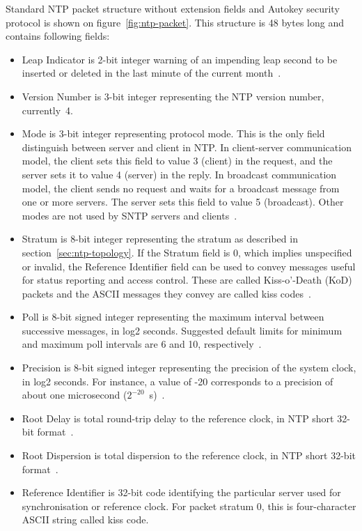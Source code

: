 Standard NTP packet structure without extension fields and
Autokey security protocol is shown on figure~\ref{fig:ntp-packet}.
This structure is 48 bytes long and contains following fields:
\begin{itemize}
\item
Leap Indicator is 2-bit integer warning of an impending leap
second to be inserted or deleted in the last minute of the current
month~\cite{rfc5905}.
\item
Version Number is 3-bit integer representing the NTP
version number, currently~4.
\item
Mode is 3-bit integer representing protocol mode.
This is the only field distinguish between server and client in NTP.
In client-server communication model, the client sets this field to value 3 (client) in the request,
and the server sets it to value 4 (server) in the reply.
In broadcast communication model, the client sends no request
and waits for a broadcast message from one or more servers.
The server sets this field to value 5 (broadcast).
Other modes are not used by SNTP servers and clients~\cite{rfc4330}.
\item
Stratum is 8-bit integer representing the stratum as described in section~\ref{sec:ntp-topology}.
If the Stratum field is 0, which implies unspecified or invalid, the
Reference Identifier field can be used to convey messages useful for
status reporting and access control.
These are called Kiss-o'-Death (KoD)
packets and the ASCII messages they convey are called kiss codes~\cite{rfc5905}.
\item
Poll is 8-bit signed integer representing the maximum interval between
successive messages, in log2 seconds.
Suggested default limits for minimum and maximum poll intervals are 6 and 10, respectively~\cite{rfc5905}.
\item
Precision is 8-bit signed integer representing the precision of the
system clock, in log2 seconds.
For instance, a value of -20
corresponds to a precision of about one microsecond ($2^{-20}$~s)~\cite{rfc5905}.
\item
Root Delay is total round-trip delay to the reference clock, in NTP short 32-bit format~\cite{rfc5905}.
\item
Root Dispersion is total dispersion to the reference clock, in NTP short 32-bit format~\cite{rfc5905}.
\item
Reference Identifier is 32-bit code identifying the particular server used for synchronisation
or reference clock.
For packet stratum 0, this is four-character ASCII string called kiss code.

\end{itemize}
